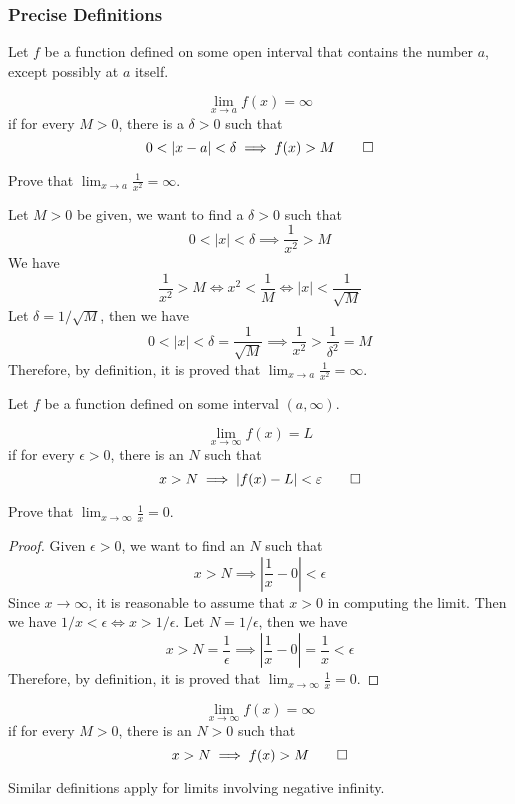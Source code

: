 \subsubsection{Precise Definitions}
Let \(f\) be a function defined on some open interval that contains the number
\(a\), except possibly at \(a\) itself.
\begin{definition}
    \[\lim_{x\to a}f(x)=\infty\] if for every \(M>0\), there is a
    \(\delta>0\) such that \[0<|x-a|<\delta\implies f(x)>M \qedhere\]
\end{definition}
\begin{problem}
    Prove that \(\displaystyle{\lim_{x\to a}\frac{1}{x^2}=\infty}\).
\end{problem}
\begin{solution}
    Let \(M>0\) be given, we want to find a \(\delta>0\) such that
    \[0<|x|<\delta\implies\frac{1}{x^2}>M\]
    We have
    \[\frac{1}{x^2}>M\iff x^2<\frac{1}{M}\iff|x|<\frac{1}{\sqrt{M}}\]
    Let \(\delta=1/\sqrt{M}\), then we have
    \[0<|x|<\delta=\frac{1}{\sqrt{M}}\implies\frac{1}{x^2}
    >\frac{1}{\delta^2}=M\]
    Therefore, by definition, it is proved that
    \(\displaystyle{\lim_{x\to a}\frac{1}{x^2}=\infty}\).
\end{solution}
Let \(f\) be a function defined on some interval \((a,\infty)\).
\begin{definition}
    \[\lim_{x\to \infty}f(x)=L\] if for every \(\epsilon>0\), there is an
    \(N\) such that \[x>N\implies|f(x)-L|<\epsilon \qedhere\]
\end{definition}
\begin{problem}
    Prove that \(\displaystyle{\lim_{x\to \infty}\frac{1}{x}=0}\).
\end{problem}
\begin{proof}
    Given \(\epsilon>0\), we want to find an \(N\) such that
    \[x>N\implies\left|\frac{1}{x}-0\right|<\epsilon\]
    Since \(x\to \infty\), it is reasonable to assume that \(x>0\) in
    computing the limit.
    Then we have \(1/x<\epsilon\iff x>1/\epsilon\).
    Let \(N=1/\epsilon\), then we have
    \[x>N=\frac{1}{\epsilon}\implies\left|\frac{1}{x}-0\right|=\frac{1}{x}
    <\epsilon\]
    Therefore, by definition, it is proved that
    \(\displaystyle{\lim_{x\to \infty}\frac{1}{x}=0}\).
\end{proof}
\begin{definition}
    \[\lim_{x\to \infty}f(x)=\infty\] if for every \(M>0\), there is an
    \(N>0\) such that \[x>N\implies f(x)>M \qedhere\]
\end{definition}
Similar definitions apply for limits involving negative infinity.